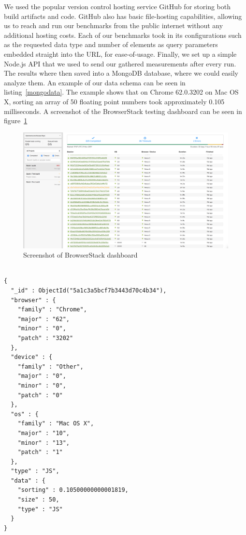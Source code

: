 \documentclass[conference]{IEEEtran}
\begin{document}
We used the popular version control hosting service GitHub for storing both
build artifacts and code. GitHub also has basic file-hosting capabilities,
allowing us to reach and run our benchmarks from the public internet without
any additional hosting costs. Each of our benchmarks took in its configurations
such as the requested data type and number of elements as query parameters
embedded straight into the URL, for ease-of-usage. Finally, we set up a simple
Node.js API that we used to send our gathered measurements after every run. The
results where then saved into a MongoDB database, where we could easily analyze
them. An example of our data schema can be seen in listing~\ref{mongodata}. The
example shows that on Chrome 62.0.3202 on Mac OS X, sorting an array of 50
floating point numbers took approximately 0.105 milliseconds. A screenshot of
the BrowserStack testing dashboard can be seen in figure~\ref{stackpic}

\begin{figure}[htbp]
\includegraphics[width=\linewidth,keepaspectratio]{stack.png}
  \caption{Screenshot of BrowserStack dashboard}\label{stackpic}
\end{figure}

\begin{lstlisting}[caption={Measurement data example},label=mongodata, basicstyle=\scriptsize]

{
  "_id" : ObjectId("5a1c3a5bcf7b3443d70c4b34"),
  "browser" : {
    "family" : "Chrome",
    "major" : "62",
    "minor" : "0",
    "patch" : "3202"
  },
  "device" : {
    "family" : "Other",
    "major" : "0",
    "minor" : "0",
    "patch" : "0"
  },
  "os" : {
    "family" : "Mac OS X",
    "major" : "10",
    "minor" : "13",
    "patch" : "1"
  },
  "type" : "JS",
  "data" : {
    "sorting" : 0.10500000000001819,
    "size" : 50,
    "type" : "JS"
  }
}
\end{lstlisting}
\end{document}
